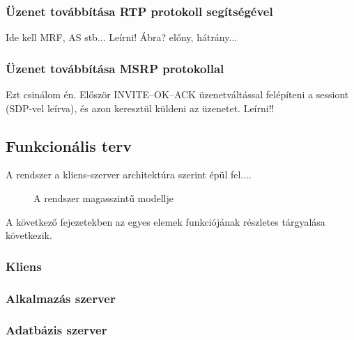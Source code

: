 \subsubsection{Üzenet továbbítása RTP protokoll segítségével}
Ide kell MRF, AS stb... Leírni! Ábra? előny, hátrány...

\subsubsection{Üzenet továbbítása MSRP protokollal}
Ezt csinálom én. Először INVITE--OK--ACK üzenetváltással felépíteni a sessiont (SDP-vel leírva), és azon keresztül küldeni az üzenetet. Leírni!!

\subsection{Funkcionális terv}

A rendszer a kliens-szerver architektúra szerint épül fel....

\begin{figure}[htbp]
\center
{}
\caption{A rendszer magasszintű modellje}
\label{fig:model}
\end{figure}

A következő fejezetekben az egyes elemek funkciójának részletes tárgyalása
következik.

\subsubsection{Kliens}
\label{sec:kliens_pc}


\subsubsection{Alkalmazás szerver}


\subsubsection{Adatbázis szerver}
\label{sec:adatbszerver}


